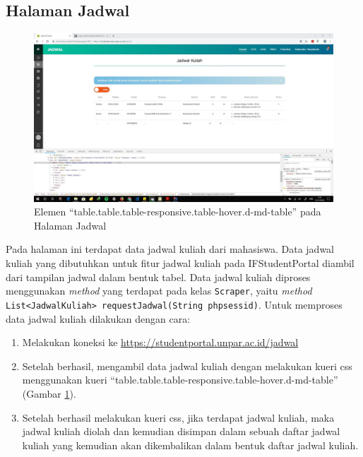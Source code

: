 \subsection{Halaman Jadwal}
		\begin{figure}[H]
			\centering
			\includegraphics[scale=0.3]{Gambar/Jadwal_user}
			\caption{Elemen ``table.table.table-responsive.table-hover.d-md-table'' pada Halaman Jadwal}
			\label{pic:jadwal_user}
		\end{figure}
Pada halaman ini terdapat data jadwal kuliah dari mahasiswa. Data jadwal kuliah yang dibutuhkan untuk fitur jadwal kuliah pada IFStudentPortal diambil dari tampilan jadwal dalam bentuk tabel. Data jadwal kuliah diproses menggunakan \textit{method} yang terdapat pada kelas \texttt{Scraper}, yaitu  \textit{method} \texttt{List<JadwalKuliah> requestJadwal(String phpsessid)}. Untuk memproses data jadwal kuliah dilakukan dengan cara:
\begin{enumerate}
	\item Melakukan koneksi ke \url{https://studentportal.unpar.ac.id/jadwal}
	\item Setelah berhasil, mengambil data jadwal kuliah dengan melakukan kueri css menggunakan kueri ``table.table.table-responsive.table-hover.d-md-table'' (Gambar \ref{pic:jadwal_user}).
	\item Setelah berhasil melakukan kueri css, jika terdapat jadwal kuliah, maka jadwal kuliah diolah dan kemudian disimpan dalam sebuah daftar jadwal kuliah yang kemudian akan dikembalikan dalam bentuk daftar jadwal kuliah. 
\end{enumerate}

